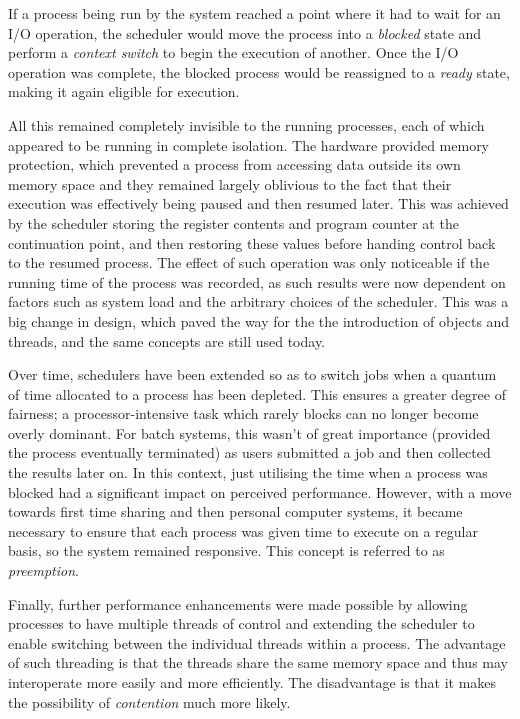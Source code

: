 If a process being run by the system reached a point where it had to
wait for an I/O operation, the scheduler would move the process into a
\emph{blocked} state and perform a \emph{context switch} to begin the
execution of another.  Once the I/O operation was complete, the
blocked process would be reassigned to a \emph{ready} state, making it
again eligible for execution.

All this remained completely invisible to the running processes, each
of which appeared to be running in complete isolation.  The hardware
provided memory protection, which prevented a process from accessing
data outside its own memory space and they remained largely oblivious
to the fact that their execution was effectively being paused and then
resumed later.  This was achieved by the scheduler storing the
register contents and program counter at the continuation point, and
then restoring these values before handing control back to the resumed
process.  The effect of such operation was only noticeable if the
running time of the process was recorded, as such results were now
dependent on factors such as system load and the arbitrary choices of
the scheduler.  This was a big change in design, which paved the way
for the the introduction of objects and threads, and the same concepts
are still used today.

Over time, schedulers have been extended so as to switch jobs when a
quantum of time allocated to a process has been depleted.  This
ensures a greater degree of fairness; a processor-intensive task which
rarely blocks can no longer become overly dominant.  For batch
systems, this wasn't of great importance (provided the process
eventually terminated) as users submitted a job and then collected the
results later on.  In this context, just utilising the time when a
process was blocked had a significant impact on perceived performance.
However, with a move towards first time sharing and then personal
computer systems, it became necessary to ensure that each process was
given time to execute on a regular basis, so the system remained
responsive.  This concept is referred to as \emph{preemption}.

Finally, further performance enhancements were made possible by
allowing processes to have multiple threads of control and extending
the scheduler to enable switching between the individual threads
within a process.  The advantage of such threading is that the threads
share the same memory space and thus may interoperate more easily and
more efficiently.  The disadvantage is that it makes the possibility
of \emph{contention} much more likely.

